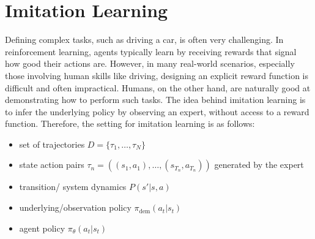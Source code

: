 \section{Imitation Learning}
Defining complex tasks, such as driving a car, is often very challenging. 
In reinforcement learning, agents typically learn by receiving rewards that
signal how good their actions are. However, in many real-world scenarios, especially
those involving human skills like driving, designing an explicit reward function is difficult
and often impractical. Humans, on the other hand, are naturally good at demonstrating how to 
perform such tasks.\newline 
The idea behind imitation learning is to infer the underlying policy by observing an expert, 
without access to a reward function. 
Therefore, the setting for imitation learning is as follows:
\begin{itemize}
    \item set of trajectories $D = \{\tau_1,\dots,\tau_N\}$
    \item state action pairs  $\tau_n = ((s_1,a_1),\dots,(s_{T_n},a_{T_n}))$ generated by the expert
    \item transition/ system dynamics $P(s'|s,a)$
    \item underlying/observation policy $\pi_{\text{dem}}(a_t|s_t)$
    \item agent policy $\pi_\theta(a_t|s_t)$
\end{itemize}

